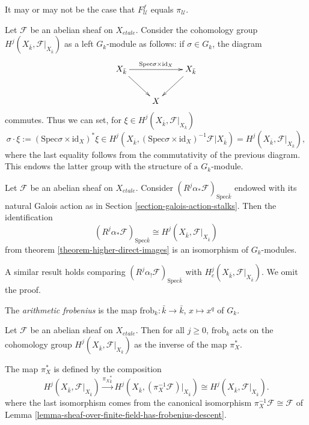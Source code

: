 \begin{remark}
\label{remark-may-be-confusing}
It may or may not be the case that $F^f_\mathcal{U}$ equals $\pi_\mathcal{U}$.
\end{remark}

\noindent
Let $\mathcal{F}$ be an abelian sheaf on $X_{etale}$. Consider the cohomology
group $H^j (X_{\bar k}, \mathcal{F}|_{X_{\bar k}})$ as a left $G_k$-module as
follows: if $\sigma \in G_k$, the diagram
$$
\xymatrix{
X_{\bar k} \ar[rd] \ar^{\text{Spec} \sigma \times \text{id}_X}[rr] && X_{\bar
k} \ar[ld]\\
& X
}
$$
commutes. Thus we can set, for $\xi \in H^j (X_{\bar k}, \mathcal{F}|_{X_{\bar
k}})$
$$
\sigma \cdot \xi := (\text{Spec} \sigma \times \text{id}_X)^*\xi \in
H^j(X_{\bar k}, (\text{Spec} \sigma \times \text{id}_X)^{-1}
\mathcal{F}|{X_{\bar k}})
= H^j (X_{\bar k}, \mathcal{F}|_{X_{\bar k}}),
$$
where the last equality follows from the commutativity of the previous diagram.
This endows the latter group with the structure of a $G_k$-module.

\begin{lemma}
\label{lemma-two-actions-agree}
Let $\mathcal{F}$ be an abelian sheaf on $X_{etale}$. Consider
$(R^j\alpha_*\mathcal{F})_{\text{Spec} \bar k}$ endowed with its natural Galois
action as in Section \ref{section-galois-action-stalks}. Then the
identification
$$
(R^j\alpha_*\mathcal{F})_{\text{Spec} \bar k} \cong H^j (X_{\bar k},
\mathcal{F}|_{X_{\bar k}})
$$
from theorem \ref{theorem-higher-direct-images} is an isomorphism of
$G_k$-modules.
\end{lemma}

A similar result holds comparing $(R^j\alpha_!\mathcal{F})_{\text{Spec} \bar
k}$ with $H^j_c (X_{\bar k}, \mathcal{F}|_{X_{\bar k}})$. We omit the proof.

\begin{definition}
\label{definition-arithmetic-frobenius}
The {\it arithmetic frobenius} is the map
$\text{frob}_k : \bar k \to \bar k$, $x \mapsto x^q$ of $G_k$.
\end{definition}

\begin{theorem}
\label{theorem-geometric-arithmetic-inverse}
Let $\mathcal{F}$ be an abelian sheaf on $X_{etale}$. Then for all $j\geq 0$,
$\text{frob}_k$ acts on the cohomology group $H^j(X_{\bar k},
\mathcal{F}|_{X_{\bar k}})$ as the inverse of the map $\pi_X^*$.
\end{theorem}

\noindent
The map $\pi_X^*$ is defined by the composition
$$
H^j(X_{\bar k}, \mathcal{F}|_{X_{\bar k}}) \xrightarrow{{\pi_X}_{\bar k}^*}
H^j(X_{\bar k}, (\pi_X^{-1} \mathcal{F})|_{X_{\bar k}}) \cong
H^j(X_{\bar k}, \mathcal{F}|_{X_{\bar k}}).
$$
where the last isomorphism comes from the canonical isomorphism
$\pi_X^{-1} \mathcal{F} \cong \mathcal{F}$ of
Lemma \ref{lemma-sheaf-over-finite-field-has-frobenius-descent}.

